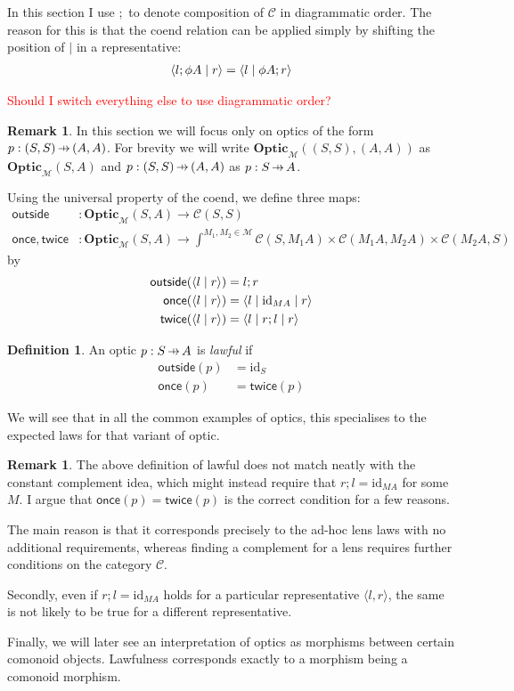 \documentclass[11pt,a4paper]{article}
\theoremstyle{plain}
\theoremstyle{definition}
\newtheorem{definition}[theorem]{Definition}
\newtheorem{remark}[theorem]{Remark}
\newcommand{\C}{\mathscr{C}}
\newcommand{\M}{\mathscr{M}}
\newcommand{\Optic}{\mathbf{Optic}}
\newcommand{\id}{\mathrm{id}}
\newcommand{\rep}[2]{{\ensuremath \left\langle #1 \mid #2 \right\rangle}}
\newcommand{\repthree}[3]{{\ensuremath \langle #1 \mid #2 \mid #3 \rangle}}
\newcommand{\outside}{\mathsf{outside}}
\newcommand{\once}{\mathsf{once}}
\newcommand{\twice}{\mathsf{twice}}
\newcommand{\hto}{\ensuremath{\,\mathaccent\shortmid\rightarrow\,}}
\newcommand{\todo}[1]{\textcolor{red}{\small #1}}
\begin{document}
In this section I use $;$ to denote composition of $\C$ in diagrammatic order. The reason for this is that the coend relation can be applied simply by shifting the position of $\mid$ in a representative:
\begin{align*}
\rep{l;\phi A}{r} = \rep{l}{\phi A;r}
\end{align*}

\todo{Should I switch everything else to use diagrammatic order?}

\begin{remark}
  In this section we will focus only on optics of the form $p : (S,S) \hto (A, A)$. For brevity we will write $\Optic_\M((S, S), (A, A))$ as $\Optic_\M(S, A)$ and $p : (S, S) \hto (A, A)$ as $p : S \hto A$.
\end{remark}

Using the universal property of the coend, we define three maps:
\begin{align*}
  \outside &: \Optic_\M(S, A) \to \C(S, S) \\
  \once, \twice &: \Optic_\M(S, A) \to \int^{M_1, M_2 \in \M} \C(S, M_1 A) \times \C(M_1 A, M_2 A) \times \C(M_2 A, S)
\end{align*}
by
\begin{align*}
  \outside(\rep{l}{r}) &= l;r \\
  \once(\rep{l}{r}) &= \repthree{l}{\id_{MA}}{r} \\
  \twice(\rep{l}{r}) &= \repthree{l}{r;l}{r}
\end{align*}

\begin{definition}
  An optic $p : S \hto A$ is \emph{lawful} if
  \begin{align*}
    \outside(p) &= \id_S \\
    \once(p) &= \twice(p)
  \end{align*}
\end{definition}

We will see that in all the common examples of optics, this specialises to the expected laws for that variant of optic.

\begin{remark}
The above definition of lawful does not match neatly with the constant complement idea, which might instead require that $r;l = \id_{MA}$ for some $M$. I argue that $\once(p) = \twice(p)$ is the correct condition for a few reasons. 

The main reason is that it corresponds precisely to the ad-hoc lens laws with no additional requirements, whereas finding a complement for a lens requires further conditions on the category $\C$.

Secondly, even if $r;l = \id_{MA}$ holds for a particular representative $\langle l, r \rangle$, the same is not likely to be true for a different representative. 

Finally, we will later see an interpretation of optics as morphisms between certain comonoid objects. Lawfulness corresponds exactly to a morphism being a comonoid morphism.
\end{remark}
\end{document}
